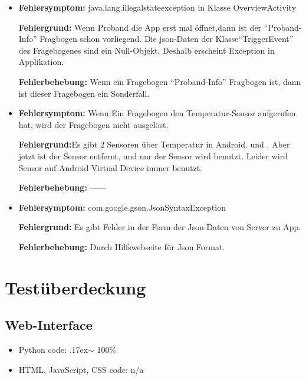 \documentclass[a4paper]{scrreprt}
\begin{document}
			  \begin{itemize}
				   \item \textbf{Fehlersymptom:} java.lang.illegalstateexception in Klasse OverviewActivity
				  	\par \textbf{Fehlergrund:} Wenn Proband die App erst mal öffnet,dann ist der ``Proband-Info'' Fragbogen schon vorliegend. Die json-Daten der Klasse``TriggerEvent'' des Fragebogenes sind ein Null-Objekt. Deshalb erscheint Exception in Applikation.
			  		\par \textbf{Fehlerbehebung:} Wenn ein Fragebogen ``Proband-Info'' Fragbogen ist, dann ist dieser Fragebogen ein Sonderfall.
                  \item \textbf{Fehlersymptom:} Wenn Ein Fragebogen den Temperatur-Sensor aufgerufen hat, wird der Fragebogen nicht ausgel\"ost.
				  \par \textbf{Fehlergrund:}Es gibt 2  Sensoren \"uber Temperatur in Android. {\color{blue}{TYPE-TEMPERATURE }} und {\color{blue}{TYPE-AMBIENT-TEMPERATURE }}. Aber jetzt ist der Sensor {\color{blue}{TYPE-TEMPERATURE }} entfernt, und nur der Sensor {\color{blue}{TYPE-AMBIENT-TEMPERATURE }} wird benutzt. Leider wird Sensor {\color{blue}{TYPE-TEMPERATURE }} auf Android Virtual Device immer benutzt.
			  	  \par\textbf{Fehlerbehebung:} ——

                  \item \textbf{Fehlersymptom:} com.google.gson.JsonSyntaxException
				  \par \textbf{Fehlergrund:} Es gibt Fehler in der Form der Json-Daten von Server zu App.
			  	  \par\textbf{Fehlerbehebung:} Durch Hilfswebseite f\"ur Json Format.


			  \end{itemize}
			
			
		\newpage
		\chapter{Test\"uberdeckung}
			\section{Web-Interface}
			     \begin{itemize}
                     \item Python code: {\raise.17ex\hbox{$\scriptstyle\sim$}} 100\%
                     \item HTML, JavaScript, CSS code: n/a
                 \end{itemize}
			
\end{document}
